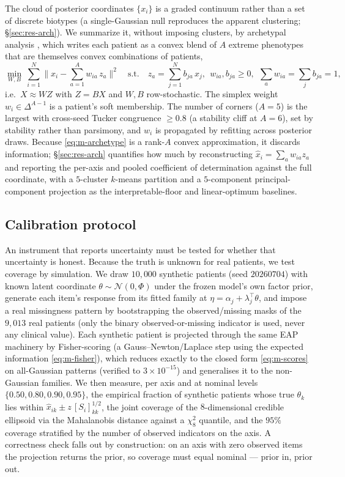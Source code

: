 The cloud of posterior coordinates $\{x_i\}$ is a graded continuum rather than a
set of discrete biotypes (a single-Gaussian null reproduces the apparent
clustering; \S\ref{sec:res-arch}). We summarize it, without imposing clusters, by
archetypal analysis \citep{cutler1994archetypal}, which writes each patient as a
convex blend of $A$ extreme phenotypes that are themselves convex combinations of
patients,
\begin{equation}
  \min_{W,B}\ \sum_{i=1}^{N}\Big\|x_i-\sum_{a=1}^{A} w_{ia}\,z_a\Big\|^{2}
  \quad\text{s.t.}\quad z_a=\sum_{j=1}^{N} b_{ja}\,x_j,\ \
  w_{ia},b_{ja}\ge0,\ \ \textstyle\sum_a w_{ia}=\sum_j b_{ja}=1 ,
  \label{eq:m-archetype}
\end{equation}
i.e.\ $X\approx WZ$ with $Z=BX$ and $W,B$ row-stochastic. The simplex weight
$w_i\in\Delta^{A-1}$ is a patient's soft membership. The number of corners
($A=5$) is the largest with cross-seed Tucker congruence $\ge0.8$ (a stability
cliff at $A=6$), set by stability rather than parsimony, and $w_i$ is propagated by
refitting across posterior draws. Because \eqref{eq:m-archetype} is a rank-$A$
convex approximation, it discards information; \S\ref{sec:res-arch} quantifies how
much by reconstructing $\hat x_i=\sum_a w_{ia}z_a$ and reporting the per-axis and
pooled coefficient of determination against the full coordinate, with a $5$-cluster
$k$-means partition and a $5$-component principal-component projection as the
interpretable-floor and linear-optimum baselines.

\subsection{Calibration protocol}
\label{sec:m-calib}

An instrument that reports uncertainty must be tested for whether that uncertainty
is honest. Because the truth is unknown for real patients, we test coverage by
simulation. We draw $10{,}000$ synthetic patients (seed $20260704$) with known
latent coordinate $\theta\sim\mathcal N(0,\Phi)$ under the frozen model's own
factor prior, generate each item's response from its fitted family at
$\eta=\alpha_j+\lambda_j^{\top}\theta$, and impose a real missingness pattern by
bootstrapping the observed/missing masks of the $9{,}013$ real patients (only the
binary observed-or-missing indicator is used, never any clinical value). Each
synthetic patient is projected through the same EAP machinery by Fisher-scoring
(a Gauss--Newton/Laplace step using the expected information \eqref{eq:m-fisher}),
which reduces exactly to the closed form \eqref{eq:m-scores} on all-Gaussian
patterns (verified to $3\times10^{-15}$) and generalises it to the non-Gaussian
families. We then measure, per axis and at nominal levels
$\{0.50,0.80,0.90,0.95\}$, the empirical fraction of synthetic patients whose true
$\theta_k$ lies within $\hat x_{ik}\pm z\,[S_i]_{kk}^{1/2}$, the joint coverage of
the $8$-dimensional credible ellipsoid via the Mahalanobis distance against a
$\chi^2_8$ quantile, and the $95\%$ coverage stratified by the number of observed
indicators on the axis. A correctness check falls out by construction: on an axis
with zero observed items the projection returns the prior, so coverage must equal
nominal --- prior in, prior out.

